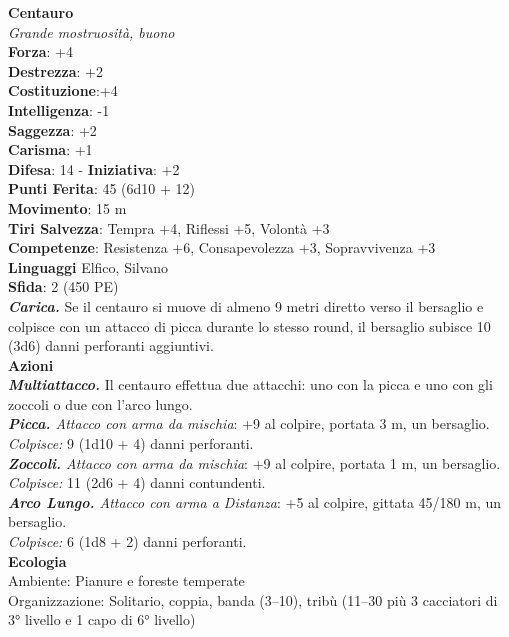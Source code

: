 \begin{multicols}{2}
\medskip\textbf{Centauro}\\
\emph{Grande mostruosità, buono}\\
\textbf{Forza}: +4\\
\textbf{Destrezza}: +2\\
\textbf{Costituzione}:+4 \\
\textbf{Intelligenza}: -1\\
\textbf{Saggezza}: +2\\
\textbf{Carisma}: +1\\
\textbf{Difesa}: 14 - \textbf{Iniziativa}: +2\\
\textbf{Punti Ferita}: 45 (6d10 + 12)\\
\textbf{Movimento}: 15 m\\
\textbf{Tiri Salvezza}: Tempra +4, Riflessi +5, Volontà +3\\
\textbf{Competenze}: Resistenza +6, Consapevolezza +3, Sopravvivenza +3\\
\textbf{Linguaggi} Elfico, Silvano\\
\textbf{Sfida}: 2 (450 PE)\smallskip\\
\emph{\textbf{Carica.}} Se il centauro si muove di almeno 9 metri diretto verso il bersaglio e colpisce con un attacco di picca durante lo stesso round, il bersaglio subisce 10 (3d6) danni perforanti aggiuntivi. \\
\smallskip\textbf{Azioni}\\
\emph{\textbf{Multiattacco.}} Il centauro effettua due attacchi: uno con la picca e uno con gli zoccoli o due con l'arco lungo.\\
\emph{\textbf{Picca.} Attacco con arma da mischia}: +9 al colpire, portata 3 m, un bersaglio.\\
\emph{Colpisce:} 9 (1d10 + 4) danni perforanti.\\
\emph{\textbf{Zoccoli.} Attacco con arma da mischia}: +9 al colpire, portata 1 m, un bersaglio.\\
\emph{Colpisce:} 11 (2d6 + 4) danni contundenti.\\
\emph{\textbf{Arco Lungo.} Attacco con arma a Distanza}: +5 al colpire, gittata 45/180 m, un bersaglio.\\
\emph{Colpisce:} 6 (1d8 + 2) danni perforanti.\\
\textbf{Ecologia}\\
Ambiente: Pianure e foreste temperate\\
Organizzazione: Solitario, coppia, banda (3–10), tribù (11–30 più 3 cacciatori di 3° livello e 1 capo di 6° livello)\\

\end{multicols}
